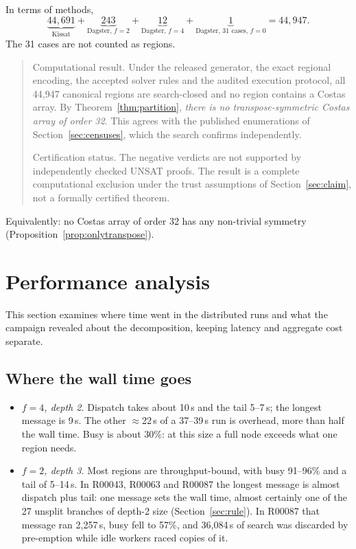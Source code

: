\documentclass[11pt,a4paper]{article}
\theoremstyle{definition}
\newcommand{\st}[1]{\textsf{#1}}
\begin{document}
\noindent In terms of methods,
\[
\underbrace{44{,}691}_{\text{Kissat}}
+\underbrace{243}_{\text{Dagster, }f=2}
+\underbrace{12}_{\text{Dagster, }f=4}
+\underbrace{1}_{\text{Dagster, 31 cases, }f=0}
=44{,}947 .
\]
The 31 cases are not counted as regions.

\begin{quote}
Computational result. Under the released generator, the exact regional encoding, the
accepted solver rules and the audited execution protocol, all 44{,}947 canonical regions are
\st{search-closed} and no region contains a Costas array. By Theorem~\ref{thm:partition},
\emph{there is no transpose-symmetric Costas array of order 32}. This agrees with the published
enumerations of Section~\ref{sec:censuses}, which the search confirms independently.

Certification status. The negative verdicts are not supported by independently
checked UNSAT proofs. The result is a complete computational exclusion under the trust
assumptions of Section~\ref{sec:claim}, not a formally certified theorem.
\end{quote}

Equivalently: no Costas array of order 32 has any non-trivial symmetry
(Proposition~\ref{prop:onlytranspose}).

\section{Performance analysis}\label{sec:perf}
This section examines where time went in the distributed runs and what the campaign revealed about the decomposition, keeping latency and aggregate cost separate.


\subsection{Where the wall time goes}
\begin{itemize}
\item \emph{$f=4$, depth 2.} Dispatch takes about 10\,s and the tail 5--7\,s; the longest message
is 9\,s. The other $\approx$22\,s of a 37--39\,s run is overhead, more than half the wall time.
Busy is about 30\%: at this size a full node exceeds what one region needs.
\item \emph{$f=2$, depth 3.} Most regions are throughput-bound, with busy 91--96\% and a tail of
5--14\,s. In R00043, R00063 and R00087 the longest message is almost dispatch plus tail: one
message sets the wall time, almost certainly one of the 27 unsplit branches of depth-2 size
(Section~\ref{sec:rule}). In R00087 that message ran 2{,}257\,s, busy fell to 57\%, and
36{,}084\,s of search was discarded by pre-emption while idle workers raced copies of it.
\end{itemize}
\end{document}
